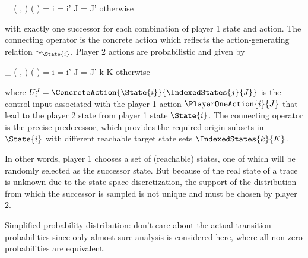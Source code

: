 \startformula
    \Transition_\GameGraph
        \Big( ,  \Big)
        \Big(  \Big)
    = \startmathcases
        \MC \startgathered
                \NC \StartIf i = i' \MidAnd J = J'
                \NR
                \NC \quad \MidAnd {} \neq \emptyset
                \NR
            \stopgathered
        \NR
        \NC otherwise \EndComma
        \NR
    \stopmathcases
\stopformula

with exactly one successor for each combination of player 1 state and action.
The connecting operator is the concrete action which reflects the action-generating relation $\sim_{\State {i}}$.
Player 2 actions are probabilistic and given by

\startformula
    \Transition_\GameGraph
        \Big( ,  \Big)
        \Big(  \Big)
    = \startmathcases
        \NC \displaystyle{}
        \MC \startgathered
                \NC \StartIf i = i' \MidAnd J = J' \MidAnd k \in K
                \NR
                \NC \quad \MidAnd {} \neq \emptyset
                \NR
            \stopgathered
        \NR
        \NC otherwise \EndComma
        \NR
    \stopmathcases
\stopformula

where $U_i^J = \ConcreteAction{\State{i}}{\IndexedStates{j}{J}}$ is the control input associated with the player 1 action $\PlayerOneAction{i}{J}$ that lead to the player 2 state from player 1 state $\State{i}$.
The connecting operator is the precise predecessor, which provides the required origin subsets in $\State{i}$ with different reachable target state sets $\IndexedStates{k}{K}$.

In other words, player 1 chooses a set of (reachable) states, one of which will be randomly selected as the successor state.
But because of the real state of a trace is unknown due to the state space discretization, the support of the distribution from which the successor is sampled is not unique and must be chosen by player 2.

Simplified probability distribution: don't care about the actual transition probabilities since only almost sure analysis is considered here, where all non-zero probabilities are equivalent.

